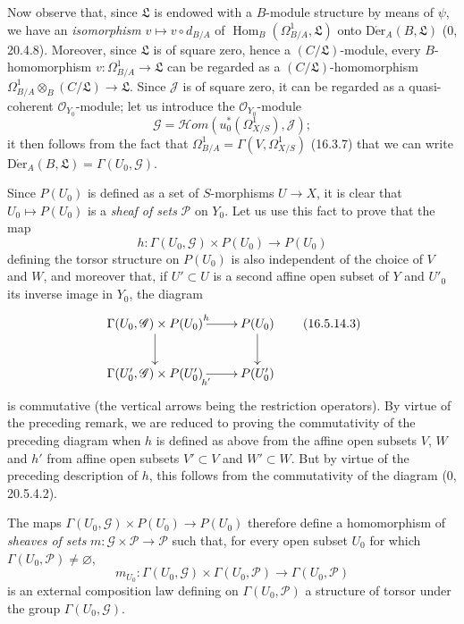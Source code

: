 \begin{env}[16.5.14]
Now observe that, since $\mathfrak{L}$ is endowed with a
$B$-module structure by means of $\psi$, we have an \emph{isomorphism}
$v\mapsto v\circ d_{B/A}$ of
$\operatorname{Hom}_B(\Omega_{B/A}^1,\mathfrak{L})$ onto
$\operatorname{D\acute{e}r}_A(B,\mathfrak{L})$ (0, 20.4.8). Moreover, since
$\mathfrak{L}$ is of square zero, hence a $(C/\mathfrak{L})$-module, every
$B$-homomorphism $v:\Omega_{B/A}^1\to\mathfrak{L}$ can be regarded
as a $(C/\mathfrak{L})$-homomorphism
$\Omega_{B/A}^1\otimes_B(C/\mathfrak{L})\to\mathfrak{L}$. Since
$\mathscr{J}$ is of square zero, it can be regarded as a quasi-coherent
$\mathcal{O}_{Y_0}$-module; let us introduce the
$\mathcal{O}_{Y_0}$-module
\[
  \mathscr{G}=\mathscr{H}om(u_0^*(\Omega_{X/S}^1),\mathscr{J});
  \tag{16.5.14.2}
  \label{IV.16.5.14.2}
\]
it then follows from the fact that
$\Omega_{B/A}^1=\Gamma(V,\Omega_{X/S}^1)$ (16.3.7) that we can write
$\operatorname{D\acute{e}r}_A(B,\mathfrak{L})=\Gamma(U_0,\mathscr{G})$.

Since $P(U_0)$ is defined as a set of $S$-morphisms $U\to X$, it is
clear that $U_0\mapsto P(U_0)$ is a \emph{sheaf of sets}
$\mathscr{P}$ on $Y_0$. Let us use this fact to prove that the map
\[
  h:\Gamma(U_0,\mathscr{G})\times P(U_0)\longrightarrow P(U_0)
\]
defining the torsor structure on $P(U_0)$ is also independent of the
choice of $V$ and $W$, and moreover that, if $U'\subset U$ is a second affine
open subset of $Y$ and $U'_0$ its inverse image in $Y_0$, the diagram
\[
  \xymatrix{
    \Gamma(U_0,\mathscr{G})\times P(U_0)\ar[d]\ar[r]^h
      & P(U_0)\ar[d]\\
    \Gamma(U'_0,\mathscr{G})\times P(U'_0)\ar[r]_{h'}
      & P(U'_0)
  }
  \tag{16.5.14.3}
  \label{IV.16.5.14.3}
\]
is commutative (the vertical arrows being the restriction operators).
By virtue of the preceding remark, we are reduced to proving the commutativity
of the preceding diagram when $h$ is defined as above from the
affine open subsets $V$, $W$ and $h'$ from affine open
subsets $V'\subset V$ and $W'\subset W$. But by virtue of the preceding
description of $h$, this follows from the commutativity of the diagram
(0, 20.5.4.2).

The maps
$\Gamma(U_0,\mathscr{G})\times P(U_0)\to P(U_0)$ therefore define a
homomorphism of \emph{sheaves of sets}
$m:\mathscr{G}\times\mathscr{P}\to\mathscr{P}$ such that, for every open subset
$U_0$ for which $\Gamma(U_0,\mathscr{P})\neq\varnothing$,
\[
  m_{U_0}:\Gamma(U_0,\mathscr{G})\times\Gamma(U_0,\mathscr{P})
  \longrightarrow\Gamma(U_0,\mathscr{P})
\]
is an external composition law defining on $\Gamma(U_0,\mathscr{P})$ a
structure of torsor under the group $\Gamma(U_0,\mathscr{G})$.
\end{env}

